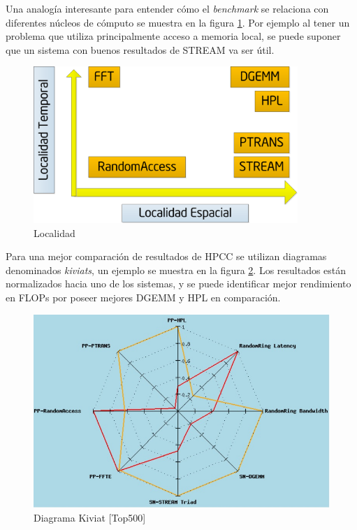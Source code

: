 \documentclass[a4paper]{report}
\begin{document}
\bigskip

Una analogía interesante para entender cómo el {\it benchmark} se relaciona con diferentes núcleos de cómputo se muestra en la figura \ref{fig:locality}. Por ejemplo al tener un problema que utiliza principalmente acceso a memoria local, se puede suponer que un sistema con buenos resultados de STREAM va ser útil.

\bigskip

\begin{figure}[H]
\begin{center}
\includegraphics[width=10cm]{locality.png}
\caption{Localidad}
\label{fig:locality}
\end{center}
\end{figure}

\bigskip

Para una mejor comparación de resultados de HPCC se utilizan diagramas
denominados {\it kiviats}, un ejemplo se muestra en la figura \ref{fig:kiviat}.
Los resultados están normalizados hacia uno de los sistemas, y se puede identificar mejor rendimiento en FLOPs por poseer mejores DGEMM y HPL en comparación.

\begin{figure}[H]
\begin{center}
\includegraphics[width=12cm]{kiviat.png}
\caption{Diagrama Kiviat [Top500]}
\label{fig:kiviat}
\end{center}
\end{figure}
\end{document}
